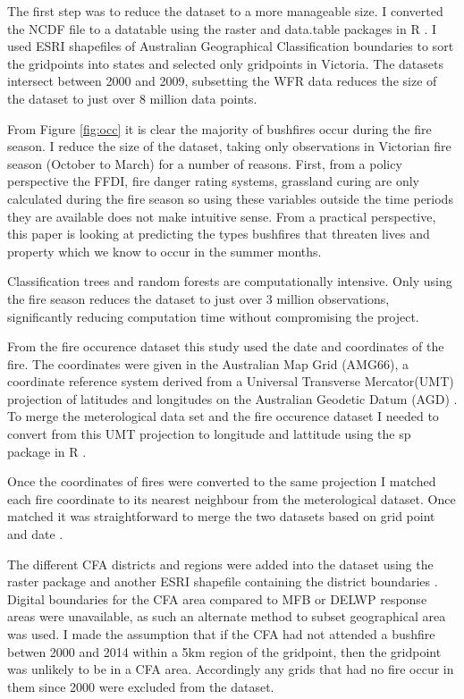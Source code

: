 \documentclass{article}
\begin{document}
The first step was to reduce the dataset to a more manageable size. I converted the NCDF file to a datatable using the raster and data.table packages in R \citep{raster, datatable}. I used ESRI shapefiles of Australian Geographical Classification boundaries \citep{ABS1259} to sort the gridpoints into states and selected only gridpoints in Victoria. The datasets intersect between 2000 and 2009, subsetting the WFR data reduces the size of the dataset to just over 8 million data points. 

From Figure \ref{fig:occ} it is clear the majority of bushfires occur during the fire season. I reduce the size of the dataset, taking only observations in Victorian fire season (October to March) for a number of reasons. First, from a policy perspective the FFDI, fire danger rating systems, grassland curing are only calculated during the fire season so using these variables outside the time periods they are available does not make intuitive sense. From a practical perspective, this paper is looking at predicting the types bushfires that threaten lives and property which we know to occur in the summer months. 

Classification trees and random forests are computationally intensive. Only using the fire season reduces the dataset to just over 3 million observations, significantly reducing computation time without compromising the project. 

From the fire occurence dataset this study used the date and coordinates of the fire. The coordinates were given in the Australian Map Grid (AMG66), a coordinate reference system derived from a Universal Transverse Mercator(UMT) projection of latitudes and longitudes on the Australian Geodetic Datum (AGD) \citep{featherstone96}. To merge the meterological data set and the fire occurence dataset I needed to convert from this UMT projection to longitude and lattitude using the sp package in R \citep{sp08}. 

Once the coordinates of fires were converted to the same projection I matched each fire coordinate to its nearest neighbour from the meterological dataset. Once matched it was straightforward to merge the two datasets based on grid point and date \citep{datatable}. 

The different CFA districts and regions were added into the dataset using the raster package and another ESRI shapefile containing the district boundaries \citep{raster}. 
Digital boundaries for the CFA area compared to MFB or DELWP response areas were unavailable, as such an alternate method to subset geographical area was used. I made the assumption that if the CFA had not attended a bushfire betwen 2000 and 2014 within a 5km region of the gridpoint, then the gridpoint was unlikely to be in a CFA area. Accordingly any grids that had no fire occur in them since 2000 were excluded from the dataset. 
\end{document}
